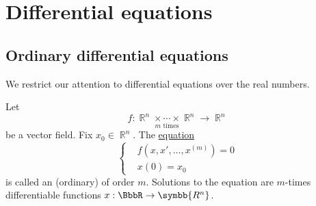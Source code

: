 \section{Differential equations}\label{sec:diffeq}
\subsection{Ordinary differential equations}\label{subsec:ordinary_differential_equations}

\begin{remark}\label{rem:real_ode}
  We restrict our attention to differential equations over the real numbers.
\end{remark}

\begin{definition}\label{def:ode}
  Let
  \begin{equation*}
    f: \underset {m \text{ times}} {\BbbR^n \times \cdots \times \BbbR^n} \to \BbbR^n
  \end{equation*}
  be a vector field. Fix \( x_0 \in \BbbR^n \). The \hyperref[ex:equations]{equation}
  \begin{equation*}
    \begin{cases}
       & f(x, x', \ldots, x^{(m)}) = 0 \\
       & x(0) = x_0
    \end{cases}
  \end{equation*}
  is called an (ordinary)  of order \( m \). Solutions to the equation are \( m \)-times differentiable functions \( x: \BbbR \to \symbb{R^n} \).
\end{definition}
